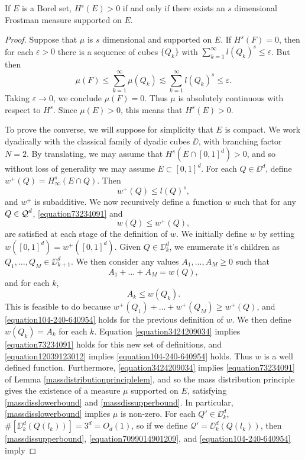 \begin{theorem}
	If $E$ is a Borel set, $H^s(E) > 0$ if and only if there exists an $s$ dimensional Frostman measure supported on $E$.
\end{theorem}
\begin{proof}
	Suppose that $\mu$ is $s$ dimensional and supported on $E$. If $H^s(F) = 0$, then for each $\varepsilon > 0$ there is a sequence of cubes $\{ Q_k \}$ with $\sum_{k = 1}^\infty l(Q_k)^s \leq \varepsilon$. But then
	\[ \mu(F) \leq \sum_{k = 1}^\infty \mu(Q_k) \lesssim \sum_{k = 1}^\infty l(Q_k)^s \leq \varepsilon. \]
	Taking $\varepsilon \to 0$, we conclude $\mu(F) = 0$. Thus $\mu$ is absolutely continuous with respect to $H^s$. Since $\mu(E) > 0$, this means that $H^s(E) > 0$.

	To prove the converse, we will suppose for simplicity that $E$ is compact. We work dyadically with the classical family of dyadic cubes $\DD$, with branching factor $N = 2$.  By translating, we may assume that $H^s(E \cap [0,1]^d) > 0$, and so without loss of generality we may assume $E \subset [0,1]^d$. For each $Q \in \DD^d$, define $w^+(Q) = H^s_\infty(E \cap Q)$. Then
	\begin{equation} \label{equation7099014901209} w^+(Q) \leq l(Q)^s, \end{equation}
	and $w^+$ is subadditive. We now recursively define a function $w$ such that for any $Q \in \operatorname{\mathcal{Q}}^d$, \eqref{equation73234091} and
	\begin{equation} \label{equation104-240-640954} w(Q) \leq w^+(Q), \end{equation}
	are satisfied at each stage of the definition of $w$. We initially define $w$ by setting $w([0,1]^d) = w^+([0,1]^d)$. Given $Q \in \DD_k^d$, we enumerate it's children as $Q_1, \dots, Q_M \in \DD_{k+1}^d$. We then consider any values $A_1, \dots, A_M \geq 0$ such that
  	\begin{equation} \label{equation3424209034}
  		A_1 + \dots + A_M = w(Q),
  	\end{equation}
  	and for each $k$,
  	\begin{equation} \label{equation12039123012}
  		A_k \leq w(Q_k).
  	\end{equation}
	This is feasible to do because $w^+(Q_1) + \dots + w^+(Q_M) \geq w^+(Q)$, and \eqref{equation104-240-640954} holds for the previous definition of $w$. We then define $w(Q_k) = A_k$ for each $k$. Equation \eqref{equation3424209034} implies \eqref{equation73234091} holds for this new set of definitions, and \eqref{equation12039123012} implies \eqref{equation104-240-640954} holds. Thus $w$ is a well defined function. Furthermore, \eqref{equation3424209034} implies \eqref{equation73234091} of Lemma \ref{massdistributionprinciplelem}, and so the mass distribution principle gives the existence of a measure $\mu$ supported on $E$, satisfying \eqref{massdisslowerbound} and \eqref{massdissupperbound}. In particular, \eqref{massdisslowerbound} implies $\mu$ is non-zero. For each $Q' \in \DD_k^d$, $\#[\DD_k^d(Q(l_k))] = 3^d = O_d(1)$, so if we define $\mathcal{Q}' = \DD_k^d(Q(l_k))$, then \eqref{massdissupperbound}, \eqref{equation7099014901209}, and \eqref{equation104-240-640954} imply

\end{proof}
